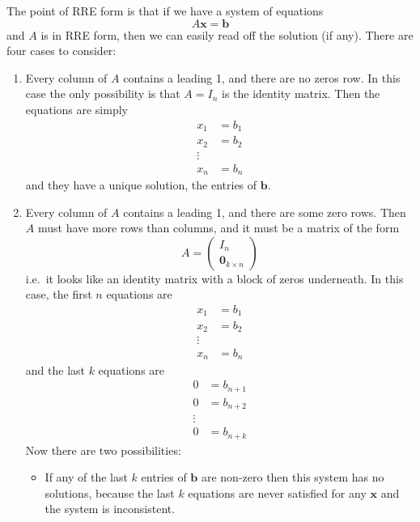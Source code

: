 \documentclass[12pt]{report}
\theoremstyle{definition}
\begin{document}
The point of RRE form is that if we have a system of equations\[
    A\pmb{x} = \pmb{b}
\]and $A$ is in RRE form, then we can easily read off the solution (if any).
There are four cases to consider:
\begin{enumerate}[label = (\arabic*)]
    \item Every column of $A$ contains a leading 1, and there are no zeros row.
        In this case the only possibility is that $A = I_n$ is the identity matrix.
        Then the equations are simply\[
            \begin{align*}
                x_1 & = b_1 \\
                x_2 & = b_2 \\
                \vdots \\
                x_n & = b_n 
            \end{align*}
        \]
        and they have a unique solution, the entries of $\pmb{b}$.

    \item Every column of $A$ contains a leading 1, and there are some zero rows.
        Then $A$ must have more rows than columns, and it must be a matrix of the form\[
            A = 
            \begin{pmatrix}
                  I_n \\
                  \pmb{0}_{k \times n}
            \end{pmatrix} 
        \]
        i.e.\ it looks like an identity matrix with a block of zeros underneath.
        In this case, the first $n$ equations are\[
            \begin{align*}
                x_1 & = b_1 \\
                x_2 & = b_2 \\
                \vdots \\
                x_n & = b_n
            \end{align*}
        \]
        and the last $k$ equations are\[
            \begin{align*}
                0 & = b_{n + 1} \\
                0 & = b_{n + 2} \\
                \vdots \\
                0 & = b_{n + k}
            \end{align*}
        \]
        Now there are two possibilities:
        \begin{itemize}
                \item If any of the last $k$ entries of $\pmb{b}$ are non-zero
                    then this system has no solutions, because the last $k$ equations
                    are never satisfied for any $\pmb{x}$ and the system is inconsistent.


\end{itemize}
\end{enumerate}
\end{document}
